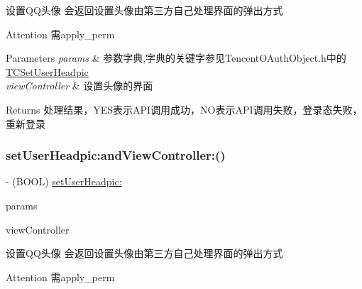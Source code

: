 设置\+Q\+Q头像 会返回设置头像由第三方自己处理界面的弹出方式 \begin{DoxyAttention}{Attention}
需apply\+\_\+perm 
\end{DoxyAttention}

\begin{DoxyParams}{Parameters}
{\em params} & 参数字典,字典的关键字参见\+Tencent\+O\+Auth\+Object.\+h中的\mbox{\hyperlink{interface_t_c_set_user_headpic}{T\+C\+Set\+User\+Headpic}} \\
\hline
{\em view\+Controller} & 设置头像的界面 \\
\hline
\end{DoxyParams}
\begin{DoxyReturn}{Returns}
处理结果，\+Y\+E\+S表示\+A\+P\+I调用成功，\+N\+O表示\+A\+P\+I调用失败，登录态失败，重新登录 
\end{DoxyReturn}
\mbox{\label{interface_tencent_o_auth_afd9016fc8dbd669e309fb90f938436a3}} 
\subsubsection{\texorpdfstring{set\+User\+Headpic\+:and\+View\+Controller\+:()}{setUserHeadpic:andViewController:()}\hspace{0.1cm}{\footnotesize\ttfamily [2/2]}}
{\footnotesize\ttfamily -\/ (B\+O\+OL) \mbox{\hyperlink{interface_tencent_o_auth_a2efce592b134d225f092451cdfe7fd99}{set\+User\+Headpic\+:}} \begin{DoxyParamCaption}\item[{(N\+S\+Mutable\+Dictionary $\ast$)}]{params }\item[{andViewController:(U\+I\+View\+Controller $\ast$$\ast$)}]{view\+Controller }\end{DoxyParamCaption}}

设置\+Q\+Q头像 会返回设置头像由第三方自己处理界面的弹出方式 \begin{DoxyAttention}{Attention}
需apply\+\_\+perm 
\end{DoxyAttention}

